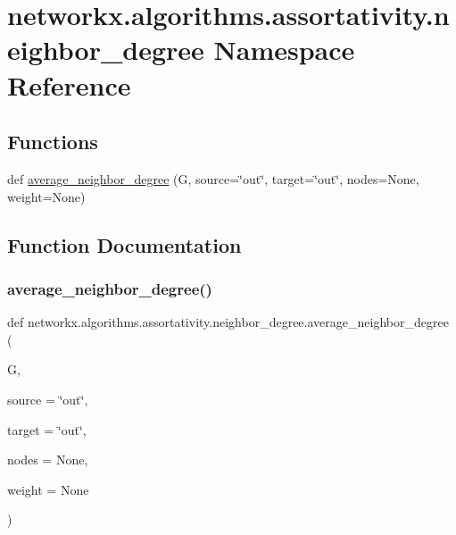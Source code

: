 \hypertarget{namespacenetworkx_1_1algorithms_1_1assortativity_1_1neighbor__degree}{}\section{networkx.\+algorithms.\+assortativity.\+neighbor\+\_\+degree Namespace Reference}
\label{namespacenetworkx_1_1algorithms_1_1assortativity_1_1neighbor__degree}
\subsection*{Functions}
\begin{DoxyCompactItemize}
\item 
def \hyperlink{namespacenetworkx_1_1algorithms_1_1assortativity_1_1neighbor__degree_a995e69499b079ec7ad9d254e81e92c1e}{average\+\_\+neighbor\+\_\+degree} (G, source=\char`\"{}out\char`\"{}, target=\char`\"{}out\char`\"{}, nodes=None, weight=None)
\end{DoxyCompactItemize}


\subsection{Function Documentation}
\mbox{\label{namespacenetworkx_1_1algorithms_1_1assortativity_1_1neighbor__degree_a995e69499b079ec7ad9d254e81e92c1e}} 
\subsubsection{\texorpdfstring{average\+\_\+neighbor\+\_\+degree()}{average\_neighbor\_degree()}}
{\footnotesize\ttfamily def networkx.\+algorithms.\+assortativity.\+neighbor\+\_\+degree.\+average\+\_\+neighbor\+\_\+degree (\begin{DoxyParamCaption}\item[{}]{G,  }\item[{}]{source = {\ttfamily \char`\"{}out\char`\"{}},  }\item[{}]{target = {\ttfamily \char`\"{}out\char`\"{}},  }\item[{}]{nodes = {\ttfamily None},  }\item[{}]{weight = {\ttfamily None} }\end{DoxyParamCaption})}

